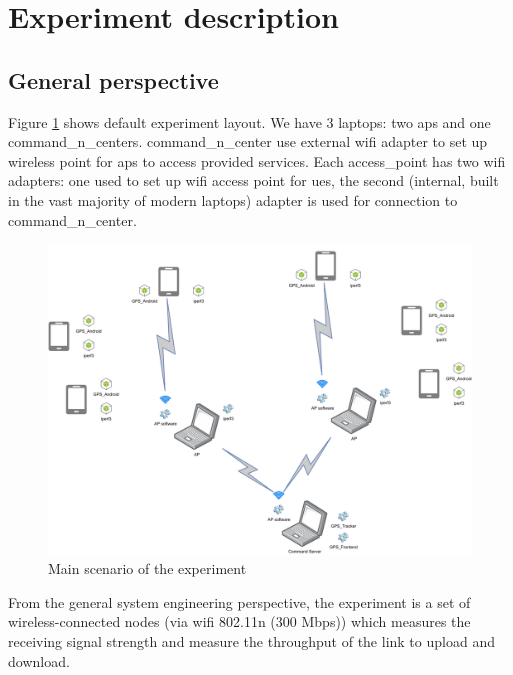 
\section{Experiment description}\label{experiment-description}

\subsection{General perspective}\label{general-perspective}

Figure \ref{fig:experiment-overall-layout} shows default experiment layout. We have 3 laptops: two \glspl{ap} and one \glspl{command_n_center}. \Gls{command_n_center} use external \gls{wifi} adapter to set up wireless point for \glspl{ap} to access provided services. Each \acrshort{access_point} has two \gls{wifi} adapters: one used to set up \gls{wifi} access point for \glspl{ue}, the second (internal, built in the vast majority of modern laptops) adapter is used for connection to \gls{command_n_center}.

\begin{figure}[H]
	\centering
	\includegraphics[width=\linewidth,keepaspectratio]{images/Deployment Diagram-Free-structure_scheme.pdf}
	\caption{Main scenario of the experiment}
	\label{fig:experiment-overall-layout}
\end{figure}

From the general system engineering perspective, the experiment is a set
of wireless-connected nodes (via \gls{wifi} 802.11n (300 Mbps)) which measures the receiving signal strength and measure the throughput of the link to upload and download.

